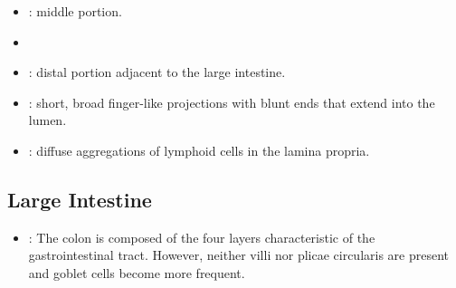 \begin{itemize}
\begin{multicols}{2}
\begin{itemize}
    \item {}: middle portion. 
    
    \begin{center}
    \end{center}
    
    \item {}
    
    \begin{center}
    \end{center}
    
    \item {}: distal portion adjacent to the large intestine. 
    
    \begin{center}
    \end{center}
    
    \item {}: short, broad finger-like projections with blunt ends that extend into the lumen.
    
    \begin{center}
    \end{center}
    
    \item {}: diffuse aggregations of lymphoid cells in the lamina propria.
    
    \begin{center}
    \end{center}
    
  \end{itemize}
  \end{multicols}
  
  \subsection{Large Intestine}\label{Large Intestine}
  \begin{itemize}
    \item {}: The colon is composed of the four layers characteristic of the gastrointestinal tract. However, neither villi nor plicae circularis are present and goblet cells become more frequent.
    
    \begin{center}
    \end{center}
    

\end{itemize}
\end{itemize}
